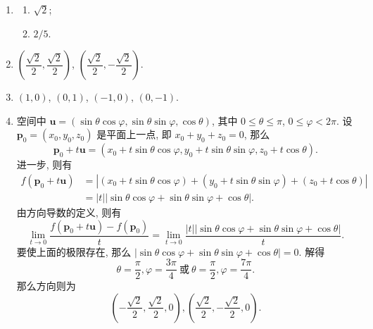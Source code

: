 % 
\begin{enumerate}
    \item %
        \begin{multicols}{2}
            \begin{enumerate}[(1)]
                \item %
                    $\sqrt{2}$;
                \item %
                    $2/5$.
            \end{enumerate} 
        \end{multicols}
    \item %
        $\left(\dfrac{\sqrt{2}}{2}, \dfrac{\sqrt{2}}{2}\right)$,
        $\left(\dfrac{\sqrt{2}}{2}, -\dfrac{\sqrt{2}}{2}\right)$.
    \item %
        $(1,0)$, $(0,1)$, $(-1,0)$, $(0,-1)$.
    \item %
        空间中 $\boldsymbol{u} = (\sin\theta\cos\varphi, \sin\theta\sin\varphi, \cos\theta)$, 其中 $0 \leqslant \theta \leqslant \pi$, $0 \leqslant \varphi < 2\pi$.
        设 $\boldsymbol{p}_0 = (x_0, y_0, z_0)$ 是平面上一点, 即 $x_0 + y_0 + z_0 = 0$, 那么
        \[
            \boldsymbol{p}_0 + t\boldsymbol{u} = (x_0 + t\sin\theta\cos\varphi, y_0 + t\sin\theta\sin\varphi, z_0 + t\cos\theta).    
        \]
        进一步, 则有
        \begin{align*}
            f(\boldsymbol{p}_0 + t\boldsymbol{u}) &= |(x_0 + t\sin\theta\cos\varphi) + (y_0 + t\sin\theta\sin\varphi) + (z_0 + t\cos\theta)| \\
            &= |t||\sin\theta\cos\varphi + \sin\theta\sin\varphi + \cos\theta|.    
        \end{align*}
        由方向导数的定义, 则有
        \[
            \lim_{t\to0}\frac{f(\boldsymbol{p}_0 + t\boldsymbol{u}) - f(\boldsymbol{p}_0)}{t}
            =
            \lim_{t\to0}\frac{|t||\sin\theta\cos\varphi + \sin\theta\sin\varphi + \cos\theta|}{t}.    
        \]
        要使上面的极限存在, 那么 $|\sin\theta\cos\varphi + \sin\theta\sin\varphi + \cos\theta| = 0$. 解得
        \[
            \theta = \frac{\pi}{2}, \varphi = \frac{3\pi}{4}\ \text{或}\ \theta = \frac{\pi}{2}, \varphi = \frac{7\pi}{4}.    
        \]
        那么方向则为
        \[
            \left(-\frac{\sqrt{2}}{2}, \frac{\sqrt{2}}{2}, 0\right), \left(\frac{\sqrt{2}}{2}, -\frac{\sqrt{2}}{2}, 0\right).    
\]
\end{enumerate}
